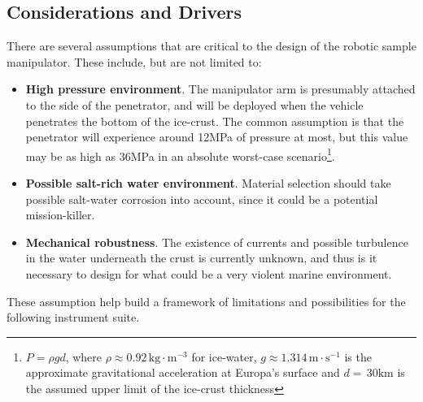 \subsection{Considerations and Drivers}
There are several assumptions that are critical to the design of the robotic sample manipulator. These include, but are not limited to:
\\ 
\begin{itemize}
\item \textbf{High pressure environment}. The manipulator arm is presumably attached to the side of the penetrator, and will be deployed when the vehicle penetrates the bottom of the ice-crust. The common assumption is that the penetrator will experience around 12MPa of pressure at most, but this value may be as high as 36MPa in an absolute worst-case scenario\footnote{$P=\rho g d$, where $\rho\approx 0.92\,\mathrm{kg\cdot m^{-3}}$ for ice-water, $g\approx 1.314\,\mathrm{m\cdot s^{-1}}$ is the approximate gravitational acceleration at Europa's surface and $d=\,30\mathrm{km}$ is the assumed upper limit of the ice-crust thickness}.
\item \textbf{Possible salt-rich water environment}. Material selection should take possible salt-water corrosion into account, since it could be a potential mission-killer.
\item \textbf{Mechanical robustness}. The existence of currents and possible turbulence in the water underneath the crust is currently unknown, and thus is it necessary to design for what could be a very violent marine environment. 
\end{itemize}
These assumption help build a framework of limitations and possibilities for the following instrument suite.
